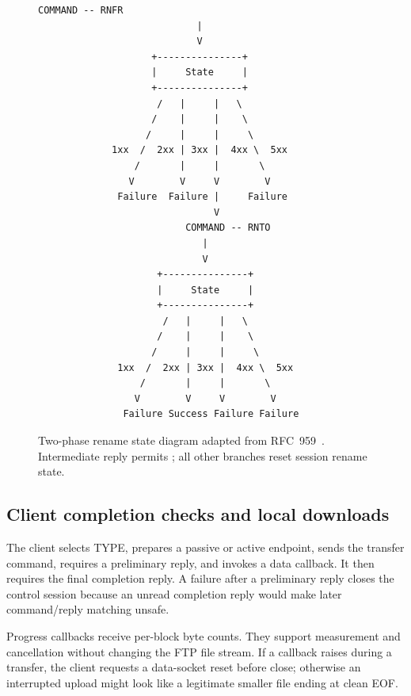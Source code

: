 \begin{figure}[H]
\centering
\begin{lstlisting}[basicstyle=\ttfamily\scriptsize,columns=fixed,numbers=none]
                         COMMAND -- RNFR
                            |
                            V
                    +---------------+
                    |     State     |
                    +---------------+
                     /   |     |   \
                    /    |     |    \
                   /     |     |     \
             1xx  /  2xx | 3xx |  4xx \  5xx
                 /       |     |       \
                V        V     V        V
              Failure  Failure |     Failure
                               V
                          COMMAND -- RNTO
                             |
                             V
                     +---------------+
                     |     State     |
                     +---------------+
                      /   |     |   \
                     /    |     |    \
                    /     |     |     \
              1xx  /  2xx | 3xx |  4xx \  5xx
                  /       |     |       \
                 V        V     V        V
               Failure Success Failure Failure
\end{lstlisting}
\caption{Two-phase rename state diagram adapted from RFC~959~\cite{rfc959}. Intermediate reply  permits ; all other branches reset session rename state.}
\label{fig:rfc959-rename}
\end{figure}

\subsection{Client completion checks and local downloads}
The client selects TYPE, prepares a passive or active endpoint, sends the transfer command, requires a preliminary reply, and invokes a data callback. It then requires the final completion reply. A failure after a preliminary reply closes the control session because an unread completion reply would make later command/reply matching unsafe.



Progress callbacks receive per-block byte counts. They support measurement and cancellation without changing the FTP file stream. If a callback raises during a transfer, the client requests a data-socket reset before close; otherwise an interrupted upload might look like a legitimate smaller file ending at clean EOF.

